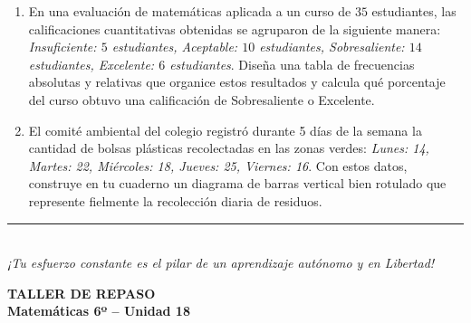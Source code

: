 \documentclass[12pt, letterpaper]{article}
\begin{document}
\begin{enumerate}[itemsep=0.7cm]
		\item En una evaluación de matemáticas aplicada a un curso de $35$ estudiantes, las calificaciones cuantitativas obtenidas se agruparon de la siguiente manera: 
		\textit{Insuficiente: $5$ estudiantes, Aceptable: $10$ estudiantes, Sobresaliente: $14$ estudiantes, Excelente: $6$ estudiantes}. 
		Diseña una tabla de frecuencias absolutas y relativas que organice estos resultados y calcula qué porcentaje del curso obtuvo una calificación de Sobresaliente o Excelente.
		
		\item El comité ambiental del colegio registró durante 5 días de la semana la cantidad de bolsas plásticas recolectadas en las zonas verdes: \textit{Lunes: 14, Martes: 22, Miércoles: 18, Jueves: 25, Viernes: 16}. Con estos datos, construye en tu cuaderno un diagrama de barras vertical bien rotulado que represente fielmente la recolección diaria de residuos.
		
	\end{enumerate}
	
	\vfill
	\begin{center}
		\rule{0.5\textwidth}{0.4pt} \\
		\vspace{0.2cm}
		\textit{¡Tu esfuerzo constante es el pilar de un aprendizaje autónomo y en Libertad!}
	\end{center}
	\newpage
	\begin{center}
		\textbf{\Large TALLER DE REPASO} \\
		\vspace{0.2cm}
		\textbf{\large Matemáticas 6º -- Unidad 18}
	\end{center}
	\vspace{0.5cm}
	
\end{document}
